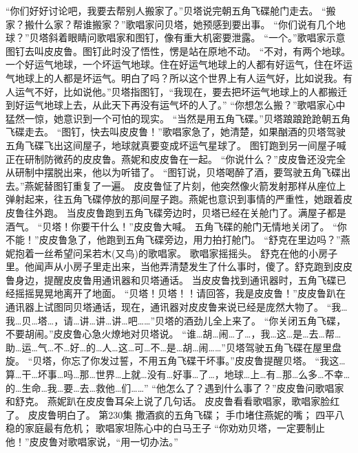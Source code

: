 \documentclass[a4paper,12pt,UTF8,twoside]{ctexbook}
\begin{document}
        “你们好好讨论吧，我要去帮别人搬家了。”贝塔说完朝五角飞碟舱门走去。  
        “搬家？搬什么家？帮谁搬家？”歌唱家问贝塔，她预感到要出事。  
        “你们说有几个地球？”贝塔斜着眼睛问歌唱家和图钉，像有重大机密要泄露。  
        “一个。”歌唱家示意图钉去叫皮皮鲁。图钉此时没了悟性，愣是站在原地不动。  
        “不对，有两个地球。一个好运气地球，一个坏运气地球。住在好运气地球上的人都有好运气，住在坏运气地球上的人都是坏运气。明白了吗？所以这个世界上有人运气好，比如说我。有人运气不好，比如说他。”贝塔指图钉，“我现在，要去把坏运气地球上的人都搬迁到好运气地球上去，从此天下再没有运气坏的人了。”  
        “你想怎么搬？”歌唱家心中猛然一惊，她意识到一个可怕的现实。  
        “当然是用五角飞碟。”贝塔踉踉跄跄朝五角飞碟走去。  
        “图钉，快去叫皮皮鲁！”歌唱家急了，她清楚，如果酗酒的贝塔驾驶五角飞碟飞出这间屋子，地球就真要变成坏运气星球了。  
        图钉跑到另一间屋子喊正在研制防微药的皮皮鲁。燕妮和皮皮鲁在一起。  
        “你说什么？”皮皮鲁还没完全从研制中摆脱出来，他以为听错了。  
        “图钉说，贝塔喝醉了酒，要驾驶五角飞碟出去。”燕妮替图钉重复了一遍。  
        皮皮鲁怔了片刻，他突然像火箭发射那样从座位上弹射起来，往五角飞碟停放的那间屋子跑。燕妮也意识到事情的严重性，她跟着皮皮鲁往外跑。  
        当皮皮鲁跑到五角飞碟旁边时，贝塔已经在关舱门了。满屋子都是酒气。  
        “贝塔！你要干什么！”皮皮鲁大喊。  
        五角飞碟的舱门无情地关闭了。  
        “你不能！”皮皮鲁急了，他跑到五角飞碟旁边，用力拍打舱门。  
        “舒克在里边吗？”燕妮抱着一丝希望问呆若木(又鸟)的歌唱家。  
        歌唱家摇摇头。  
        舒克在他的小房子里。他闻声从小房子里走出来，当他弄清楚发生了什么事时，傻了。舒克跑到皮皮鲁身边，提醒皮皮鲁用通讯器和贝塔通话。  
        当皮皮鲁找到通讯器时，五角飞碟已经摇摇晃晃地离开了地面。  
        “贝塔！贝塔！！请回答，我是皮皮鲁！”皮皮鲁趴在通讯器上试图同贝塔通话，现在，通讯器对皮皮鲁来说已经是庞然大物了。  
        “我…我…贝…塔…，请…讲…讲…讲…吧……”贝塔的酒劲儿全上来了。  
        “你关闭五角飞碟，不要胡闹。”皮皮鲁心急火燎地对贝塔说。  
        “谁…胡…闹…了…，我…这…是…去…帮…助…运…气…不…好…的…人…这…可…不…是…胡…闹……”贝塔驾驶五角飞碟在屋里盘旋。  
        “贝塔，你忘了你发过誓，不用五角飞碟干坏事。”皮皮鲁提醒贝塔。  
        “我这…算…干…坏事…吗…那…世界…上就…没有…好事…了…，地球…上…有…那…么多…不幸…的…生命…我…要…去…救他…们……”  
        “他怎么了？遇到什么事了？”皮皮鲁问歌唱家和舒克。  
        燕妮趴在皮皮鲁耳朵上说了几句话。  
        皮皮鲁看看歌唱家，歌唱家脸红了。  
        皮皮鲁明白了。          第230集  
        撒酒疯的五角飞碟；  
        手巾堵住燕妮的嘴；  
        四平八稳的家庭最有危机；  
        歌唱家坦陈心中的白马王子    
        “你劝劝贝塔，一定要制止他！”皮皮鲁对歌唱家说，“用一切办法。”  
\end{document}
